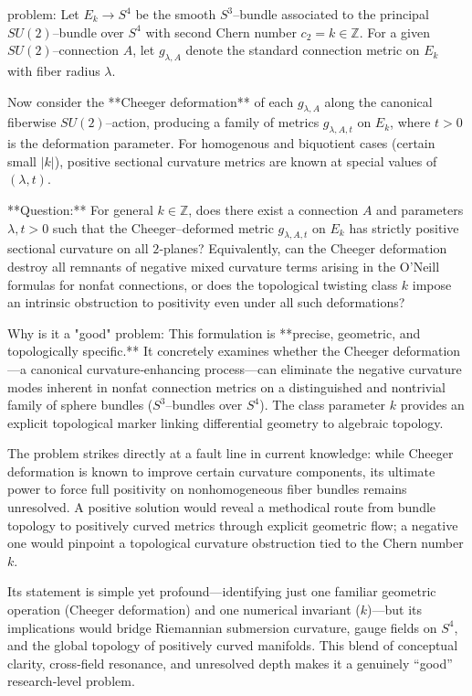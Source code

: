problem:  
Let $E_k \to S^4$ be the smooth $S^3$–bundle associated to the principal $SU(2)$–bundle over $S^4$ with second Chern number $c_2 = k \in \mathbb Z$.  
For a given $SU(2)$–connection $A$, let $g_{\lambda,A}$ denote the standard connection metric on $E_k$ with fiber radius $\lambda$.  

Now consider the **Cheeger deformation** of each $g_{\lambda,A}$ along the canonical fiberwise $SU(2)$–action, producing a family of metrics $g_{\lambda,A,t}$ on $E_k$, where $t>0$ is the deformation parameter.  For homogenous and biquotient cases (certain small $|k|$), positive sectional curvature metrics are known at special values of $(\lambda,t)$.  

**Question:**  
For general $k\in\mathbb Z$, does there exist a connection $A$ and parameters $\lambda,t>0$ such that the Cheeger–deformed metric $g_{\lambda,A,t}$ on $E_k$ has strictly positive sectional curvature on all $2$‑planes?  
Equivalently, can the Cheeger deformation destroy all remnants of negative mixed curvature terms arising in the O’Neill formulas for nonfat connections, or does the topological twisting class $k$ impose an intrinsic obstruction to positivity even under all such deformations?  

Why is it a "good" problem:  
This formulation is **precise, geometric, and topologically specific.**  It concretely examines whether the Cheeger deformation—a canonical curvature‑enhancing process—can eliminate the negative curvature modes inherent in nonfat connection metrics on a distinguished and nontrivial family of sphere bundles ($S^3$–bundles over $S^4$).  The class parameter $k$ provides an explicit topological marker linking differential geometry to algebraic topology.

The problem strikes directly at a fault line in current knowledge: while Cheeger deformation is known to improve certain curvature components, its ultimate power to force full positivity on nonhomogeneous fiber bundles remains unresolved.  A positive solution would reveal a methodical route from bundle topology to positively curved metrics through explicit geometric flow; a negative one would pinpoint a topological curvature obstruction tied to the Chern number $k$.

Its statement is simple yet profound—identifying just one familiar geometric operation (Cheeger deformation) and one numerical invariant ($k$)—but its implications would bridge Riemannian submersion curvature, gauge fields on $S^4$, and the global topology of positively curved manifolds.  This blend of conceptual clarity, cross‑field resonance, and unresolved depth makes it a genuinely “good” research‑level problem.